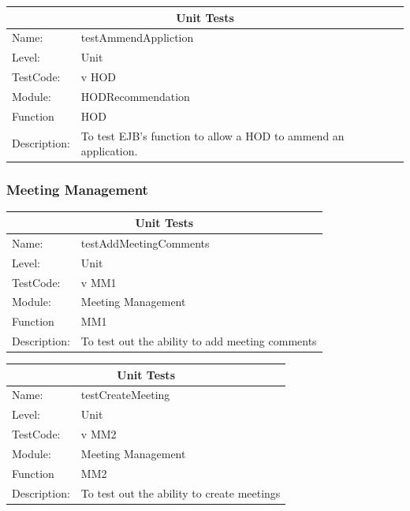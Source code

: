 \documentclass[12pt]{article}
\begin{document}
\begin{center}
\begin{tabular}{|l|p{12cm}|}
\hline
\multicolumn{2}{|c|}{\bf Unit Tests} \\
\hline
 Name: & testAmmendAppliction  \\
\hline
Level: & Unit \\
\hline
TestCode: & v HOD \\
\hline
Module:& HODRecommendation \\
\hline
Function & HOD \\
\hline
Description: & To test EJB's function to allow a HOD to ammend an application. \\
\hline
\end{tabular}
\end{center}



\subsubsection{Meeting Management}
\begin{center}
\begin{tabular}{|l|p{12cm}|}
\hline
\multicolumn{2}{|c|}{\bf Unit Tests} \\
\hline
 Name: & testAddMeetingComments  \\
\hline
Level: & Unit \\
\hline
TestCode: & v MM1 \\
\hline
Module:& Meeting Management \\
\hline
Function & MM1 \\
\hline
Description: & To test out the ability to add meeting comments  \\
\hline

\end{tabular}
\end{center}

\begin{center}
\begin{tabular}{|l|p{12cm}|}
\hline
\multicolumn{2}{|c|}{\bf Unit Tests} \\
\hline
 Name: & testCreateMeeting  \\
\hline
Level: & Unit \\
\hline
TestCode: & v MM2 \\
\hline
Module:& Meeting Management \\
\hline
Function & MM2 \\
\hline
Description: & To test out the ability to create meetings \\
\hline

\end{tabular}
\end{center}
\end{document}
